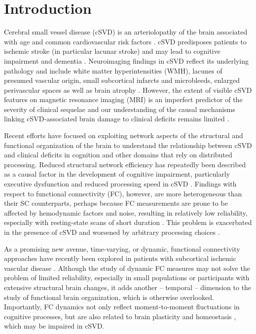\section{Introduction} \label{intro}
Cerebral small vessel disease (cSVD) is an arteriolopathy of the brain associated with age and common cardiovascular risk factors \citep{Wardlaw2013-yd}.
cSVD predisposes patients to ischemic stroke (in particular lacunar stroke) and may lead to cognitive impairment and dementia \citep{Cannistraro2019-ly}.
Neuroimaging findings in cSVD reflect its underlying pathology \citep{Wardlaw2015-ri} and include white matter hyperintensities (WMH), lacunes of presumed vascular origin, small subcortical infarcts and microbleeds, enlarged perivascular spaces as well as brain atrophy \citep{Wardlaw2013-sc}.
However, the extent of visible cSVD features on magnetic resonance imaging (MRI) is an imperfect predictor of the severity of clinical sequelae \citep{Das2019-pc} and our understanding of the causal mechanisms linking cSVD-associated brain damage to clinical deficits remains limited \citep{Bos2018-qj}.

Recent efforts have focused on exploiting network aspects of the structural \citep{Tuladhar2016-ae,Tuladhar2020-fp,Lawrence2018-ti} and functional \citep{Dey2016-qg,Schulz2021-ho} organization of the brain to understand the relationship between cSVD and clinical deficits in cognition and other domains that rely on distributed processing.
Reduced structural network efficiency has repeatedly been described as a causal factor in the development of cognitive impairment, particularly executive dysfunction and reduced processing speed in cSVD \citep{Lawrence2014-xp,Shen2020-yv,Reijmer2016-wm,Prins2005-ej}.
Findings with respect to functional connectivity (FC), however, are more heterogeneous than their SC counterparts, perhaps because FC measurements are prone to be affected by hemodynamic factors and noise, resulting in relatively low reliability, especially with resting-state scans of short duration \citep{laumann2015functional}. 
This problem is exacerbated in the presence of cSVD and worsened by arbitrary processing choices \citep{Lawrence2018-sv,Gesierich2020-db}.

As a promising new avenue, time-varying, or dynamic, functional connectivity approaches have recently been explored in patients with subcortical ischemic vascular disease \citep{Yin2022-cv,Xu2021-ib}. 
Although the study of dynamic FC measures may not solve the problem of limited reliability, especially in small populations or participants with extensive structural brain changes, it adds another -- temporal -- dimension to the study of functional brain organization, which is otherwise overlooked.
Importantly, FC dynamics not only reflect moment-to-moment fluctuations in cognitive processes, but are also related to brain plasticity and homeostasis , which may be impaired in cSVD.

